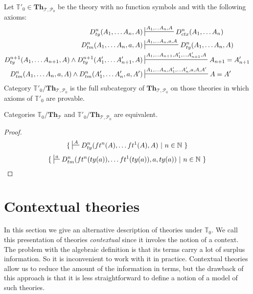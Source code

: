 \documentclass{amsart}
\theoremstyle{definition}
\theoremstyle{remark}
\newcommand{\cat}[1]{\mathbf{#1}}
\newcommand{\Th}{\cat{Th}}
\newcommand{\ThT}{\Th_{\mathcal{T}}}
\numberwithin{figure}{section}
\begin{document}
Let $\mathbb{T}'_0 \in \Th_{\mathcal{T},\mathcal{P}_0}$ be the theory with no function symbols and with the following axioms:
\begin{align*}
D^n_{ty}(A_1, \ldots A_n, A) & \sststile{}{A_1, \ldots A_n, A} D^n_{ctx}(A_1, \ldots A_n) \\
D^n_{tm}(A_1, \ldots A_n, a, A) & \sststile{}{A_1, \ldots A_n, a, A} D^n_{ty}(A_1, \ldots A_n, A) \\
D^{n+1}_{ty}(A_1, \ldots A_{n+1}, A) \land D^{n+1}_{ty}(A_1', \ldots A_{n+1}', A) & \sststile{}{A_1, \ldots A_{n+1}, A_1', \ldots A_{n+1}', A} A_{n+1} = A_{n+1}' \\
D^n_{tm}(A_1, \ldots A_n, a, A) \land D^n_{tm}(A_1', \ldots A_n', a, A') & \sststile{}{A_1, \ldots A_n, A_1', \ldots A_n', a, A, A'} A = A'
\end{align*}
Category $\mathbb{T}'_0/\Th_{\mathcal{T},\mathcal{P}_0}$ is the full subcategory of $\Th_{\mathcal{T},\mathcal{P}_0}$ on those theories in which axioms of $\mathbb{T}'_0$ are provable.

\begin{prop}
Categories $\mathbb{T}_0/\ThT$ and $\mathbb{T}'_0/\Th_{\mathcal{T},\mathcal{P}_0}$ are equivalent.
\end{prop}
\begin{proof}
\[ \{\ \sststile{}{A} D^n_{ty}(ft^n(A), \ldots ft^1(A), A)\ |\ n \in \mathbb{N}\ \} \]
\[ \{\ \sststile{}{a} D^n_{tm}(ft^n(ty(a)), \ldots ft^1(ty(a)), a, ty(a))\ |\ n \in \mathbb{N}\ \} \]
\end{proof}

\section{Contextual theories}

In this section we give an alternative description of theories under $\mathbb{T}_0$.
We call this presentation of theories \emph{contextual} since it involes the notion of a context.
The problem with the algebraic definition is that its terms carry a lot of surplus information.
So it is inconvenient to work with it in practice.
Contextual theories allow us to reduce the amount of the information in terms,
but the drawback of this approach is that it is less straightforward to define a notion of a model of such theories.
\end{document}
